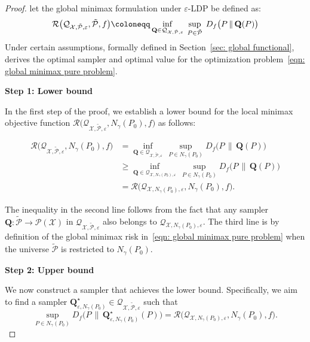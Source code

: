\documentclass[accepted]{article}
\theoremstyle{plain} %
\theoremstyle{definition}
\theoremstyle{remark}
\newcommand{\eps}{\varepsilon}
\newcommand{\bQ}{\mathbf{Q}}
\begin{document}
\begin{proof}

let the global minimax formulation under $\eps$-LDP be defined as: 
\begin{equation}\label{eqn: global minimax pure problem}\mathcal{R}\big(\mathcal{Q}_{\mathcal{X},\tilde{\mathcal{P}},\eps},\tilde{\mathcal{P}},f\big) \coloneqq \inf_{\bQ \in \mathcal{Q}_{\mathcal{X},\tilde{\mathcal{P}},\eps}} \hspace{0.1cm} \sup_{P \in \tilde{\mathcal{P}}}\hspace{0.1cm} D_f\big(P \, \| \, \bQ(P)\big)
\end{equation}
Under certain assumptions, formally defined in Section~\ref{sec: global functional}, \citet{park2024exactly} derives the optimal sampler and optimal value for the optimization problem~\eqref{eqn: global minimax pure problem}.

\textbf{Step 1: Lower bound} 

In the first step of the proof, we establish a lower bound for the local minimax objective function 
\(\mathcal{R}\big(\mathcal{Q}_{\mathcal{X},\tilde{\mathcal{P}},\eps},N_\gamma(P_0),f\big)\) as follows:

\begin{align} \label{eqn: lower bound local pure}
\mathcal{R}\big(\mathcal{Q}_{\mathcal{X},\tilde{\mathcal{P}},\eps},N_\gamma(P_0),f\big) 
&= \inf_{\bQ \in \mathcal{Q}_{\mathcal{X},\tilde{\mathcal{P}},\eps}} \, 
\sup_{P \in N_\gamma(P_0)} D_f\big(P \, \| \, \bQ(P)\big) \nonumber \\
&\geq \inf_{\bQ \in \mathcal{Q}_{\mathcal{X},N_\gamma(P_0),\eps}} \, 
\sup_{P \in N_\gamma(P_0)} D_f\big(P \, \| \, \bQ(P)\big) \nonumber \\
&= \mathcal{R}\big(\mathcal{Q}_{\mathcal{X},N_\gamma(P_0),\eps},N_\gamma(P_0),f\big).
\end{align}

The inequality in the second line follows from the fact that any sampler 
\(\bQ : \tilde{\mathcal{P}} \to \mathcal{P}(\mathcal{X})\) in 
\(\mathcal{Q}_{\mathcal{X}, \tilde{\mathcal{P}}, \eps}\) also belongs to 
\(\mathcal{Q}_{\mathcal{X}, N_\gamma(P_0), \eps}\). 
The third line is by definition of the global minimax risk in~\eqref{eqn: global minimax pure problem} when the universe $\mathcal{\tilde{P}}$ is restricted to \(N_\gamma(P_0)\).

\textbf{Step 2: Upper bound} 

We now construct a sampler that achieves the lower bound. Specifically, we aim to find a sampler 
\(\bQ^\star_{\eps, N_\gamma(P_0)} \in \mathcal{Q}_{\mathcal{X}, \tilde{\mathcal{P}}, \eps}\) such that
\[
\sup_{P \in N_\gamma(P_0)} D_f\big(P \, \| \, \bQ^\star_{\eps, N_\gamma(P_0)}(P)\big) 
= \mathcal{R}\big(\mathcal{Q}_{\mathcal{X}, N_\gamma(P_0), \eps}, N_\gamma(P_0), f\big).
\]


\end{proof}
\end{document}
